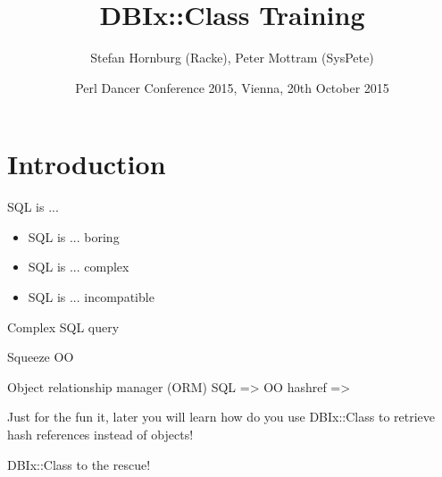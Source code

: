 \usepackage[utf8]{inputenc}
\usepackage[T1]{fontenc}
\usepackage[english]{babel}
\usepackage{caption}
\captionsetup{labelformat=empty,labelsep=none}
\usepackage{verbatim}
\usepackage{listings}
\usepackage{ulem}
\usepackage{gensymb} %
\lstset{language=Perl,basicstyle=\normalsize,tabsize=3,showstringspaces=false}

\title{DBIx::Class Training}
\author{Stefan Hornburg (Racke), Peter Mottram (SysPete)}
\date{Perl Dancer Conference 2015, Vienna, 20th October 2015}


\maketitle



\begin{frame}
  \titlepage
\end{frame}

\cleardoublepage

\tableofcontents

\cleardoublepage

\section{Introduction}

\begin{frame}{SQL is ...}
\begin{itemize}
\item SQL is ... boring
\item SQL is ... complex
\item SQL is ... incompatible
\end{itemize}
\end{frame}

\begin{frame}{Complex SQL query}
\end{frame}

\begin{frame}{Squeeze OO}

Object relationship manager (ORM)
SQL => OO
hashref => 

\end{frame}

Just for the fun it, later you will learn how do you
use DBIx::Class to retrieve hash references instead of
objects!

\begin{frame}{DBIx::Class to the rescue!}
\end{frame}

